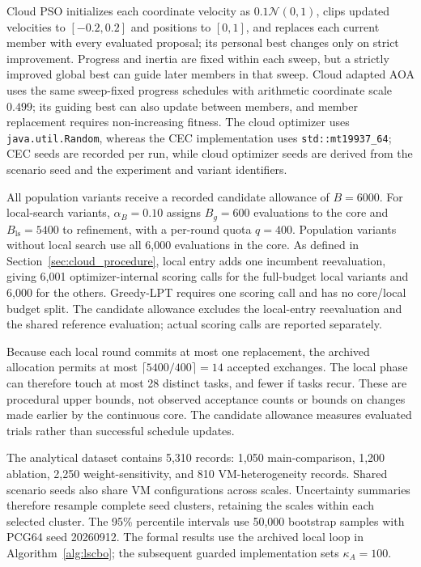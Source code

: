 \documentclass[pdflatex,onecolumn,sn-mathphys-num]{sn-jnl}
\begin{document}
Cloud PSO initializes each coordinate velocity as $0.1\mathcal{N}(0,1)$, clips updated velocities to $[-0.2,0.2]$ and positions to $[0,1]$, and replaces each current member with every evaluated proposal; its personal best changes only on strict improvement. Progress and inertia are fixed within each sweep, but a strictly improved global best can guide later members in that sweep. Cloud adapted AOA uses the same sweep-fixed progress schedules with arithmetic coordinate scale $0.499$; its guiding best can also update between members, and member replacement requires non-increasing fitness. The cloud optimizer uses \texttt{java.util.Random}, whereas the CEC implementation uses \texttt{std::mt19937\_64}; CEC seeds are recorded per run, while cloud optimizer seeds are derived from the scenario seed and the experiment and variant identifiers.

All population variants receive a recorded candidate allowance of $B=6000$. For local-search variants, $\alpha_B=0.10$ assigns $B_g=600$ evaluations to the core and $B_{\mathrm{ls}}=5400$ to refinement, with a per-round quota $q=400$. Population variants without local search use all 6,000 evaluations in the core. As defined in Section~\ref{sec:cloud_procedure}, local entry adds one incumbent reevaluation, giving 6,001 optimizer-internal scoring calls for the full-budget local variants and 6,000 for the others. Greedy-LPT requires one scoring call and has no core/local budget split. The candidate allowance excludes the local-entry reevaluation and the shared reference evaluation; actual scoring calls are reported separately.

Because each local round commits at most one replacement, the archived allocation permits at most $\lceil5400/400\rceil=14$ accepted exchanges. The local phase can therefore touch at most 28 distinct tasks, and fewer if tasks recur. These are procedural upper bounds, not observed acceptance counts or bounds on changes made earlier by the continuous core. The candidate allowance measures evaluated trials rather than successful schedule updates.

The analytical dataset contains 5,310 records: 1,050 main-comparison, 1,200 ablation, 2,250 weight-sensitivity, and 810 VM-heterogeneity records. Shared scenario seeds also share VM configurations across scales. Uncertainty summaries therefore resample complete seed clusters, retaining the scales within each selected cluster. The 95\% percentile intervals use 50,000 bootstrap samples with PCG64 seed 20260912. The formal results use the archived local loop in Algorithm~\ref{alg:lscbo}; the subsequent guarded implementation sets $\kappa_A=100$.
\end{document}
